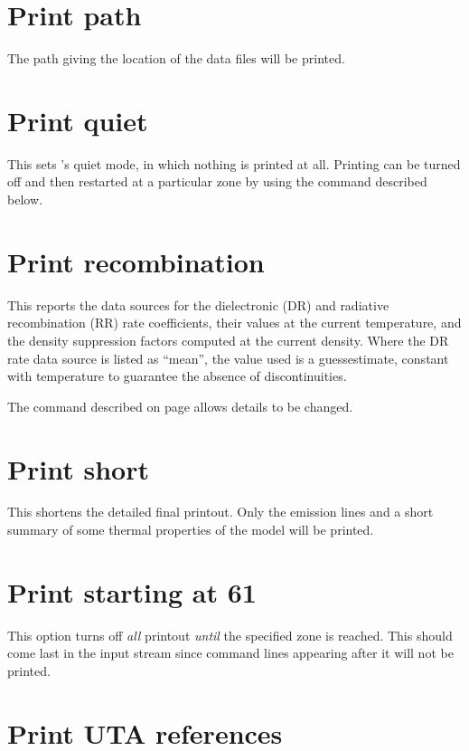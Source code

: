 \section{Print path}

The path giving the location of the data files will be printed.

\section{Print quiet}

This sets \Cloudy's quiet mode, in which nothing is printed at all.
Printing can be turned off and then restarted at a particular zone by using
the  command described below.


\section{Print recombination}
\label{sec:PrintRecombination}

\par
This reports the data sources for the dielectronic (DR) and
radiative recombination (RR) rate coefficients, their values
at the current temperature, and the density suppression
factors computed at the current density.
Where the DR rate data source is listed as ``mean'',
the value used is a guessestimate, constant with
temperature to guarantee the absence of discontinuities.

\par
The  command described on page
\pageref{sec:SetRecombination} allows details to be changed.


\section{Print short}

This shortens the detailed final printout.
Only the emission lines and
a short summary of some thermal properties of the model will be printed.

\section{Print starting at 61}

This option turns off \emph{all} printout \emph{until} the specified zone is reached.
This should come last in the input stream since command lines appearing
after it will not be printed.

\section{Print UTA references}
\label{sec:PrintUTAReferences}

